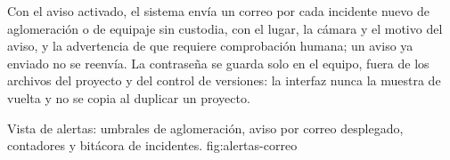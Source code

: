 Con el aviso activado, el sistema envía un correo por cada incidente
nuevo de aglomeración o de equipaje sin custodia, con el lugar, la cámara
y el motivo del aviso, y la advertencia de que requiere comprobación
humana; un aviso ya enviado no se reenvía. La contraseña se guarda solo
en el equipo, fuera de los archivos del proyecto y del control de
versiones: la interfaz nunca la muestra de vuelta y no se copia al
duplicar un proyecto.

  {Vista de alertas: umbrales de aglomeración, aviso por correo desplegado,
   contadores y bitácora de incidentes.}
  {fig:alertas-correo}
